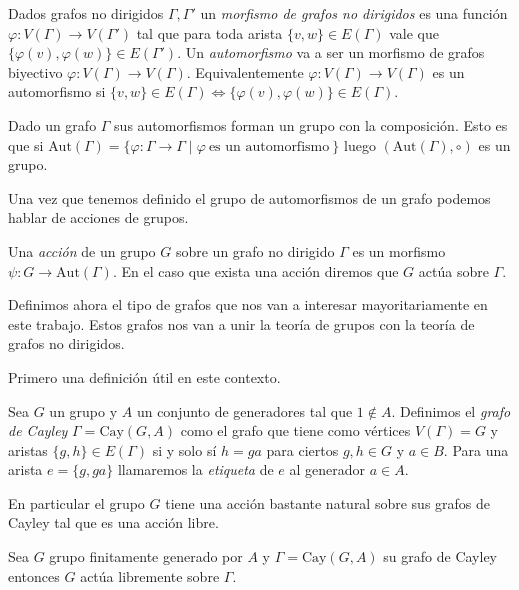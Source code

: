 \documentclass[tesis.tex]{subfiles}
\begin{document}
\begin{deff}
	Dados grafos no dirigidos $\Gamma, \Gamma'$ un \emph{morfismo de grafos no dirigidos} es una función $\varphi:V(\Gamma) \to V(\Gamma')$ tal que para toda arista $\{ v,w \} \in E(\Gamma)$ vale que $\{  \varphi(v), \varphi(w) \} \in E(\Gamma')$.
	Un \emph{automorfismo} va a ser un morfismo de grafos biyectivo $\varphi:V(\Gamma) \to V(\Gamma)$.
	Equivalentemente $\varphi: V(\Gamma) \to V(\Gamma)$ es un automorfismo si
	$\{ v,w \} \in E(\Gamma) \iff \{ \varphi(v), \varphi(w) \} \in E(\Gamma)$. 
\end{deff}

Dado un grafo $\Gamma$ sus automorfismos forman un grupo con la composición.
Esto es que si $\text{Aut}(\Gamma) = \{ \varphi: \Gamma \to \Gamma  \mid \varphi \ \text{es un automorfismo} \  \}$ luego $(\text{Aut}(\Gamma), \circ)$ es un grupo.

Una vez que tenemos definido el grupo de automorfismos de un grafo podemos hablar de acciones de grupos.

\begin{deff}
	Una \emph{acción} de un grupo $G$ sobre un grafo no dirigido $\Gamma$ es un morfismo $\psi:G \to \text{Aut}(\Gamma)$.
	En el caso que exista una acción diremos que $G$ actúa sobre $\Gamma$.
\end{deff}




Definimos ahora el tipo de grafos que nos van a interesar mayoritariamente en este trabajo.
Estos grafos nos van a unir la teoría de grupos con la teoría de grafos no dirigidos.

Primero una definición útil en este contexto.


\begin{deff}
	Sea $G$ un grupo y $A$ un conjunto de generadores tal que $1 \notin A$.
	Definimos el \emph{grafo de Cayley} $\Gamma = \text{Cay}(G,A)$ como el grafo que tiene como vértices $V(\Gamma) = G$ y aristas $\{g,h\} \in E(\Gamma)$ si y solo sí $h=ga$ para ciertos $g,h \in G$ y $a \in B$. 
	Para una arista $e = \{g,ga\}$ llamaremos la \emph{etiqueta} de $e$ al generador $a \in A$.
\end{deff}


En particular el grupo $G$ tiene una acción bastante natural sobre sus grafos de Cayley tal que es una acción libre.


\begin{lema}\label{lema_grp_acc_libre_cayley}
	Sea $G$ grupo finitamente generado por $A$ y $\Gamma = \text{Cay}(G,A)$ su grafo de Cayley entonces $G$ actúa libremente sobre $\Gamma$.
\end{lema}
\end{document}
